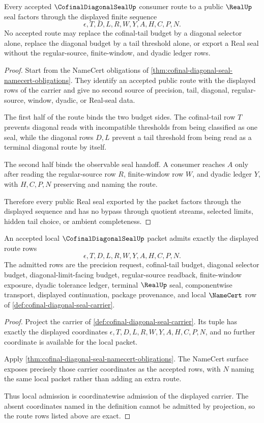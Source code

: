 \begin{theorem}
\label{thm:cofinal-diagonal-seal-route-exhaustion}
Every accepted $\CofinalDiagonalSealUp$ consumer route to a public $\RealUp$ seal factors through the displayed finite sequence
$$
\epsilon,T,D,L,R,W,Y,A,H,C,P,N.
$$
No accepted route may replace the cofinal-tail budget by a diagonal selector alone, replace the diagonal budget by a tail threshold alone, or export a Real seal without the regular-source, finite-window, and dyadic ledger rows.
\end{theorem}
\begin{proof}
Start from the NameCert obligations of \autoref{thm:cofinal-diagonal-seal-namecert-obligations}. They identify an accepted public route with the displayed rows of the carrier and give no second source of precision, tail, diagonal, regular-source, window, dyadic, or Real-seal data.

The first half of the route binds the two budget sides. The cofinal-tail row $T$ prevents diagonal reads with incompatible thresholds from being classified as one seal, while the diagonal rows $D,L$ prevent a tail threshold from being read as a terminal diagonal route by itself.

The second half binds the observable seal handoff. A consumer reaches $A$ only after reading the regular-source row $R$, finite-window row $W$, and dyadic ledger $Y$, with $H,C,P,N$ preserving and naming the route.

Therefore every public Real seal exported by the packet factors through the displayed sequence and has no bypass through quotient streams, selected limits, hidden tail choice, or ambient completeness.
\end{proof}

\begin{theorem}
\label{thm:cofinal-diagonal-seal-route-admission}
An accepted local $\CofinalDiagonalSealUp$ packet admits exactly the displayed route rows
$$
\epsilon,T,D,L,R,W,Y,A,H,C,P,N.
$$
The admitted rows are the precision request, cofinal-tail budget, diagonal selector budget, diagonal-limit-facing budget, regular-source readback, finite-window exposure, dyadic tolerance ledger, terminal $\RealUp$ seal, componentwise transport, displayed continuation, package provenance, and local $\NameCert$ row of \autoref{def:cofinal-diagonal-seal-carrier}.
\end{theorem}
\begin{proof}
Project the carrier of \autoref{def:cofinal-diagonal-seal-carrier}. Its tuple has exactly the displayed coordinates $\epsilon,T,D,L,R,W,Y,A,H,C,P,N$, and no further coordinate is available for the local packet.

Apply \autoref{thm:cofinal-diagonal-seal-namecert-obligations}. The NameCert surface exposes precisely those carrier coordinates as the accepted rows, with $N$ naming the same local packet rather than adding an extra route.

Thus local admission is coordinatewise admission of the displayed carrier. The absent coordinates named in the definition cannot be admitted by projection, so the route rows listed above are exact.
\end{proof}

